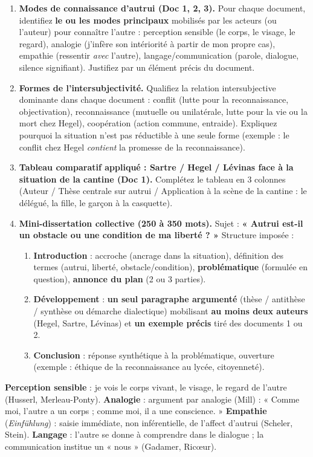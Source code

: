\documentclass[11pt]{article}
\newcommand{\cle}[1]{{\popxbold\color{popdark}#1}}
\newcounter{popsec}
\newcounter{popsub}
\newcommand{\courssub}[1]{%
  \stepcounter{popsub}%
  \par\vspace{9pt}\noindent{\popxbold\fontsize{11.5}{13}\selectfont\color{popink}{\color{poporange}\thepopsec.\thepopsub}\hspace{6pt}#1}\par\nopagebreak\vspace{4pt}
}
\begin{document}
\begin{enumerate}
    \item \textbf{Modes de connaissance d'autrui (Doc 1, 2, 3).} Pour chaque document, identifiez \textbf{le ou les modes principaux} mobilisés par les acteurs (ou l'auteur) pour connaître l'autre : \cle{perception sensible} (le corps, le visage, le regard), \cle{analogie} (j'infère son intériorité à partir de mon propre cas), \cle{empathie} (ressentir \emph{avec} l'autre), \cle{langage/communication} (parole, dialogue, silence signifiant). Justifiez par un élément précis du document.
    \item \textbf{Formes de l'intersubjectivité.} Qualifiez la relation intersubjective dominante dans chaque document : \cle{conflit} (lutte pour la reconnaissance, objectivation), \cle{reconnaissance} (mutuelle ou unilatérale, lutte pour la vie ou la mort chez Hegel), \cle{coopération} (action commune, entraide). Expliquez pourquoi la situation n'est pas réductible à une seule forme (exemple : le conflit chez Hegel \emph{contient} la promesse de la reconnaissance).
    \item \textbf{Tableau comparatif appliqué : Sartre / Hegel / Lévinas face à la situation de la cantine (Doc 1).} Complétez le tableau en 3 colonnes (Auteur / Thèse centrale sur autrui / Application à la scène de la cantine : le délégué, la fille, le garçon à la casquette).
    \item \textbf{Mini-dissertation collective (250 à 350 mots).} Sujet : \textbf{« Autrui est-il un obstacle ou une condition de ma liberté ? »} Structure imposée :
    \begin{enumerate}
        \item \textbf{Introduction} : accroche (ancrage dans la situation), définition des termes (autrui, liberté, obstacle/condition), \textbf{problématique} (formulée en question), \textbf{annonce du plan} (2 ou 3 parties).
        \item \textbf{Développement} : \textbf{un seul paragraphe argumenté} (thèse / antithèse / synthèse ou démarche dialectique) mobilisant \textbf{au moins deux auteurs} (Hegel, Sartre, Lévinas) et \textbf{un exemple précis} tiré des documents 1 ou 2.
        \item \textbf{Conclusion} : réponse synthétique à la problématique, ouverture (exemple : éthique de la reconnaissance au lycée, citoyenneté).
    \end{enumerate}
\end{enumerate}

\courssub{Ressources à mobiliser}
\begin{definition}
\textbf{Perception sensible} : je vois le corps vivant, le visage, le regard de l'autre (Husserl, Merleau-Ponty). \textbf{Analogie} : argument par analogie (Mill) : « Comme moi, l'autre a un corps ; comme moi, il a une conscience. » \textbf{Empathie} (\emph{Einfühlung}) : saisie immédiate, non inférentielle, de l'affect d'autrui (Scheler, Stein). \textbf{Langage} : l'autre se donne à comprendre dans le dialogue ; la communication institue un « nous » (Gadamer, Ricœur).
\end{definition}
\end{document}
